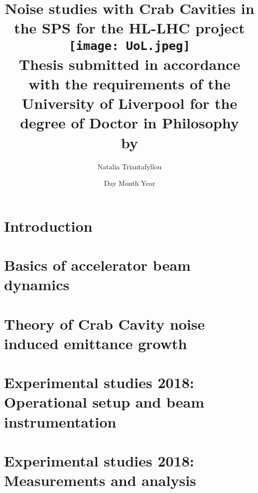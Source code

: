 \documentclass[12pt,twoside]{report} %
\begin{document}
\frontmatter
\title{
{Noise studies with Crab Cavities in the SPS for the HL-LHC project}\\
{\texttt{[image: UoL.jpeg]}} \\
{\large Thesis submitted in accordance with the requirements of the University of Liverpool for the degree of Doctor in Philosophy \\ by}
}
\author{ Natalia Triantafyllou}
\date{Day Month Year}
\maketitle
\newpage




\listoffigures
{}
\listoftables
{}

\newpage

\thispagestyle{plain} %

\listofsymbols
{}

\tableofcontents

\mainmatter

\chapter{Introduction}


\chapter{Basics of accelerator beam dynamics}


\chapter{Theory of Crab Cavity noise induced emittance growth}\label{Ch:CC_noise_theory}


\chapter{Experimental studies 2018: Operational setup and beam instrumentation}\label{Ch:2018_setup}


\chapter{Experimental studies 2018: Measurements and analysis}\label{Ch:2018_analyisis}

\end{document}
